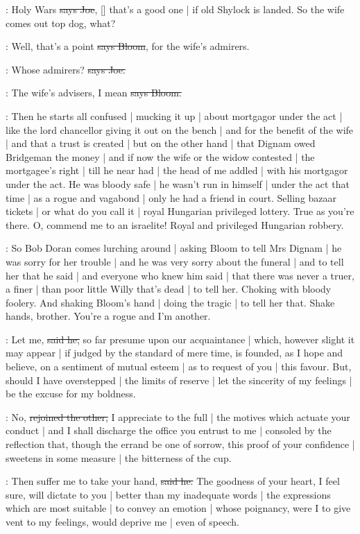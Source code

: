 \joe:
Holy Wars
\sout{says Joe},
[]
that's a good one |
if old Shylock is landed.
So the wife comes out top dog,
what?

\Bloom:
Well,
that's a point
\sout{says Bloom},
for the wife's admirers.

\joe:
Whose admirers?
\sout{says Joe.}

\Bloom:
The wife's advisers,
I mean
\sout{says Bloom.}

\Nq:
Then he starts all confused
 |
mucking it up |
about mortgagor under the act |
like the lord chancellor giving it out on the bench |
and for the benefit of the wife |
and that a trust is created |
but on the other hand |
that Dignam owed Bridgeman the money |
and if now the wife or the widow contested |
the mortgagee's right |
till he near had |
the head of me addled |
with his mortgagor under the act.
He was bloody safe |
he wasn't run in himself |
under the act that time |
as a rogue and vagabond |
only he had a friend in court.
Selling bazaar tickets |
or what do you call it |
royal Hungarian privileged lottery.
True as you're there.
O,
commend me to an israelite!
Royal and privileged Hungarian robbery.

\Nq:
So Bob Doran comes lurching around
 |
asking Bloom to tell Mrs Dignam |
he was sorry for her trouble |
and he was very sorry about the funeral |
and to tell her that he said |
and everyone who knew him said |
that there was never a truer,
a finer |
than poor little Willy that's dead |
to tell her.
Choking with bloody foolery.
And shaking Bloom's hand |
doing the tragic |
to tell her that.
Shake hands,
brother.
You're a rogue and I'm another.

\doran:
Let me,
\sout{said he,}
so far presume upon our acquaintance |
which,
however slight it may appear |
if judged by the standard of mere time,
is founded,
as I hope and believe,
on a sentiment of mutual esteem |
as to request of you |
this favour.
But,
should I have overstepped |
the limits of reserve |
let the sincerity of my feelings
 |
be the excuse for my boldness.

\Bloom:
No,
\sout{rejoined the other,}
I appreciate to the full |
the motives which actuate your conduct |
and I shall discharge the office you entrust to me |
consoled by the reflection that,
though the errand be one of sorrow,
this proof of your confidence |
sweetens in some measure |
the bitterness of the cup.

\doran:
Then suffer me to take your hand,
\sout{said he.}
The goodness of your heart,
I feel sure,
will dictate to you |
better than my inadequate words |
the expressions which are most suitable |
to convey an emotion |
whose poignancy,
were I to give vent to my feelings,
would deprive me |
even of speech.

